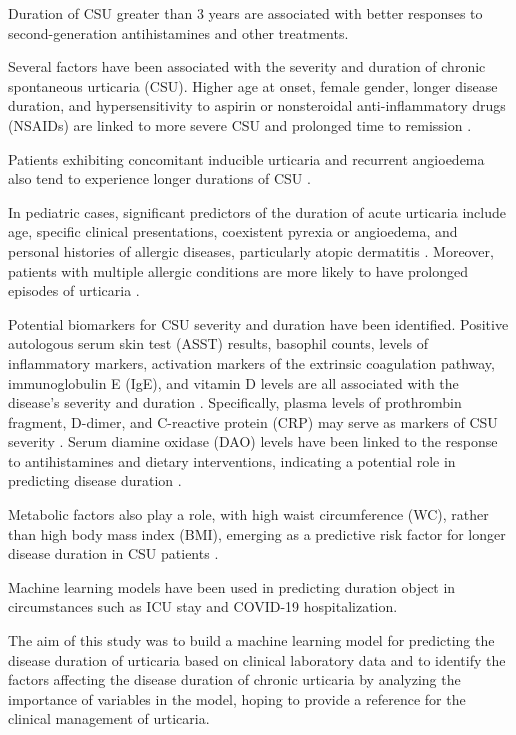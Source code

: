 \documentclass[preprint,12pt,authoryear]{elsarticle}
\begin{document}
Duration of CSU greater than 3 years are associated with better responses to second-generation antihistamines and other treatments\citep{Chiang2022Predictors}.

Several factors have been associated with the severity and duration of chronic spontaneous urticaria (CSU). Higher age at onset, female gender, longer disease duration, and hypersensitivity to aspirin or nonsteroidal anti-inflammatory drugs (NSAIDs) are linked to more severe CSU and prolonged time to remission \citep{SanchezBorges2017Factors,Rabelo-Filardi2013Parameters}. 

Patients exhibiting concomitant inducible urticaria and recurrent angioedema also tend to experience longer durations of CSU \citep{SanchezBorges2017Factors, Curto-Barredo2018Clinical}.

In pediatric cases, significant predictors of the duration of acute urticaria include age, specific clinical presentations, coexistent pyrexia or angioedema, and personal histories of allergic diseases, particularly atopic dermatitis \citep{Lin2011Predictive}. Moreover, patients with multiple allergic conditions are more likely to have prolonged episodes of urticaria \citep{Lin2011Predictive}.

Potential biomarkers for CSU severity and duration have been identified. Positive autologous serum skin test (ASST) results, basophil counts, levels of inflammatory markers, activation markers of the extrinsic coagulation pathway, immunoglobulin E (IgE), and vitamin D levels are all associated with the disease's severity and duration \citep{SanchezBorges2017Factors,Rabelo-Filardi2013Parameters}. Specifically, plasma levels of prothrombin fragment, D-dimer, and C-reactive protein (CRP) may serve as markers of CSU severity \citep{Rabelo-Filardi2013Parameters}. Serum diamine oxidase (DAO) levels have been linked to the response to antihistamines and dietary interventions, indicating a potential role in predicting disease duration \citep{Chiang2022Predictors}.

Metabolic factors also play a role, with high waist circumference (WC), rather than high body mass index (BMI), emerging as a predictive risk factor for longer disease duration in CSU patients \citep{Kim2021High}.

Machine learning models have been used in predicting duration object in circumstances such as ICU stay and COVID-19 hospitalization\citep{Wu2021Predicting, Ghosh2022An, Etu2022Prediction}. 

The aim of this study was to build a machine learning model for predicting the disease duration of urticaria based on clinical laboratory data and to identify the factors affecting the disease duration of chronic urticaria by analyzing the importance of variables in the model, hoping to provide a reference for the clinical management of urticaria.
\end{document}
